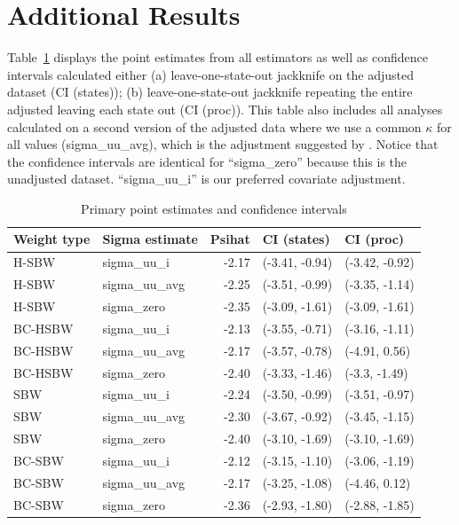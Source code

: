 \section{Additional Results}
\label{ssec:allresults}

Table~\ref{tab:confintmain} displays the point estimates from all estimators as well as confidence intervals calculated either (a) leave-one-state-out jackknife on the adjusted dataset (CI (states)); (b) leave-one-state-out jackknife repeating the entire adjusted leaving each state out (CI (proc)). This table also includes all analyses calculated on a second version of the adjusted data where we use a common $\kappa$ for all values (sigma\_uu\_avg), which is the adjustment suggested by \cite{carroll2006measurement}. Notice that the confidence intervals are identical for ``sigma\_zero'' because this is the unadjusted dataset. ``sigma\_uu\_i'' is our preferred covariate adjustment.

\begin{table}[ht]
\centering
\caption{Primary point estimates and confidence intervals}
\label{tab:confintmain}
\begin{tabular}{llrll}
  \hline
Weight type & Sigma estimate & Psihat & CI (states) & CI (proc) \\ 
  \hline
H-SBW & sigma\_uu\_i & -2.17 & (-3.41, -0.94) & (-3.42, -0.92) \\ 
  H-SBW & sigma\_uu\_avg & -2.25 & (-3.51, -0.99) & (-3.35, -1.14) \\ 
  H-SBW & sigma\_zero & -2.35 & (-3.09, -1.61) & (-3.09, -1.61) \\ 
  BC-HSBW & sigma\_uu\_i & -2.13 & (-3.55, -0.71) & (-3.16, -1.11) \\ 
  BC-HSBW & sigma\_uu\_avg & -2.17 & (-3.57, -0.78) & (-4.91, 0.56) \\ 
  BC-HSBW & sigma\_zero & -2.40 & (-3.33, -1.46) & (-3.3, -1.49) \\ 
  SBW & sigma\_uu\_i & -2.24 & (-3.50, -0.99) & (-3.51, -0.97) \\ 
  SBW & sigma\_uu\_avg & -2.30 & (-3.67, -0.92) & (-3.45, -1.15) \\ 
  SBW & sigma\_zero & -2.40 & (-3.10, -1.69) & (-3.10, -1.69) \\ 
  BC-SBW & sigma\_uu\_i & -2.12 & (-3.15, -1.10) & (-3.06, -1.19) \\ 
  BC-SBW & sigma\_uu\_avg & -2.17 & (-3.25, -1.08) & (-4.46, 0.12) \\ 
  BC-SBW & sigma\_zero & -2.36 & (-2.93, -1.80) & (-2.88, -1.85) \\ 
   \hline
\end{tabular}
\end{table}

